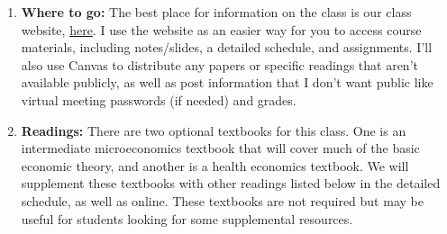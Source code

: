 \documentclass[11pt,]{article}
\begin{document}
\begin{enumerate}
\def\labelenumi{\arabic{enumi}.}
\item
  \textbf{Where to go:} The best place for information on the class is
  our class website,
  \href{https://econ372s23.classes.ianmccarthyecon.com/}{here}. I use
  the website as an easier way for you to access course materials,
  including notes/slides, a detailed schedule, and assignments. I'll
  also use Canvas to distribute any papers or specific readings that
  aren't available publicly, as well as post information that I don't
  want public like virtual meeting passwords (if needed) and grades.
\item
  \textbf{Readings:} There are two optional textbooks for this class.
  One is an intermediate microeconomics textbook that will cover much of
  the basic economic theory, and another is a health economics textbook.
  We will supplement these textbooks with other readings listed below in
  the detailed schedule, as well as online. These textbooks are not
  required but may be useful for students looking for some supplemental
  resources.


\end{enumerate}
\end{document}
